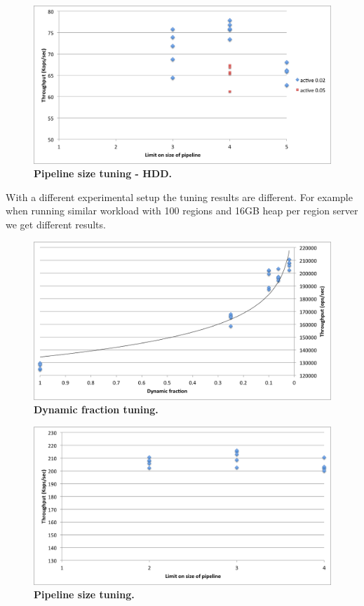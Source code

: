 \begin{figure}[htb]
\includegraphics[width=\figw]{Figs/pipeline-1-hdd.png}
\caption{{\bf Pipeline size tuning - HDD.} 
}
\label{fig:pipeline-1-hdd}
\end{figure}

With a different experimental setup the tuning results are different.
For example when running similar workload with 100 regions and 16GB heap per region server we get different results.
\begin{figure}[htb]
\includegraphics[width=\figw]{Figs/dynamic-fraction-2.png}
\caption{{\bf Dynamic fraction tuning.} 
}
\label{fig:dynamic-fraction-2}
\end{figure}

\begin{figure}[htb]
\includegraphics[width=\figw]{Figs/pipeline-2.png}
\caption{{\bf Pipeline size tuning.} 
}
\label{fig:pipeline-2}
\end{figure}


